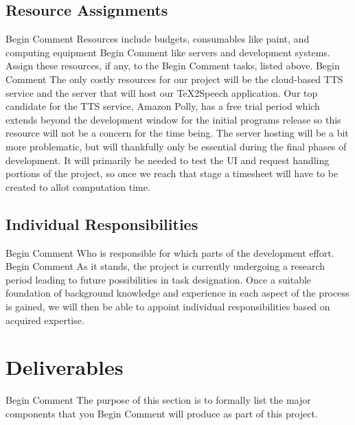                                                                                                                                                                                                                                                                                                                                                                                                                                                                                                                                                                                                                                                                                                                                                                                                                                                                                                                                                                                                                                                                                                                                                                                                                                                                                                                                                                                                                                                                                                                                                                                                                                                                                                                                                                                                                                                                                                                                                                                                                                                                                                                                                                                                                                                                                                                                                                                                                                                                                                                                                                                                                                                                                                                                                                                                                                                                                                                                                                                                                                                                                                                                                                                                                                                                                                                                                                                                                                                                                                                                                                                                                                                                                                                                                                                                                                                                                                                                                                                                                                                                                                                                                                                                                                                                                                                                                                                                                                                                                                                                                                                                                                                                                                                                                                                                                                                                                                                                                                                                                                                                                                                                                                                                                                                                                                                                                                                                                                                                                                                                                                                                                                                                                                                                                                                                                                                                                                                                                                                                                                                                                                                                                                                                                                                                                                                                                                                                                                                                                                                                                                                                                                                                                                                                                                                                                                                                                                                                                                                                                                                                                                                                                                                                                                                                                                                                                                                                                                                                                                                                                                                                                                                                                                                                                                                                                                                                                                                                                                                                                                                                                                                                                                                                                                                                                                                                                                                                                                                                                                                                                                                                                                                                                                                                                                                                                                                                                                                                                                                                                                                                                                                                                                                                                                                                                                                                                                                                                                                                                                                                                                                                                                                                                                                                                                                                                                                                                                                                                                                                                                                                                                                                                                                                                                                                                                                                                                                                                                                                                                                                                                                                                                                                                                                                                                                                                                                                                                                                                                                                                                                                                                                                                                                                                                                                                                                                                                                                                                                                                                                                                                                                                            \documentclass[letterpaper,12pt]{article}
\begin{document}
\subsection{Resource Assignments}
Begin Comment  Resources include budgets, consumables like paint, and computing equipment
Begin Comment  like servers and development systems.  Assign these resources, if any, to the
Begin Comment  tasks, listed above. 
Begin Comment 
The only costly resources for our project will be the cloud-based TTS service and the server that will host our \TeX 2Speech application. Our top candidate for the TTS service, Amazon Polly, has a free trial period which extends beyond the development window for the initial programs release so this resource will not be a concern for the time being. The server hosting will be a bit more problematic, but will thankfully only be essential during the final phases of development. It will primarily be needed to test the UI and request handling portions of the project, so once we reach that stage a timesheet will have to be created to allot computation time.
\subsection{Individual Responsibilities}
Begin Comment  Who is responsible for which parts of the development effort.
Begin Comment 
As it stands, the project is currently undergoing a research period leading to future possibilities in task designation. Once a suitable foundation of background knowledge and experience in each aspect of the process is gained, we will then be able to appoint individual responsibilities based on acquired expertise.
\section{Deliverables}
Begin Comment  The purpose of this section is to formally list the major components that you
Begin Comment  will produce as part of this project.  
\end{document}

